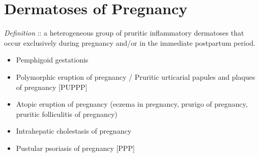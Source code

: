 \documentclass{article}
\begin{document}
	\section{Dermatoses of Pregnancy}
	\emph{Definition} :: a heterogeneous group of pruritic inflammatory dermatoses that occur exclusively during pregnancy and/or in the immediate postpartum period.
	\begin{itemize}
		\item Pemphigoid gestationis
		\item Polymorphic eruption of pregnancy / Pruritic urticarial papules and plaques of pregnancy [PUPPP]
		\item Atopic eruption of pregnancy (eczema in pregnancy, prurigo of pregnancy, pruritic folliculitis of pregnancy)
		\item Intrahepatic cholestasis of pregnancy
		\item Pustular psoriasis of pregnancy [PPP]
	\end {itemize}
\end{document}
